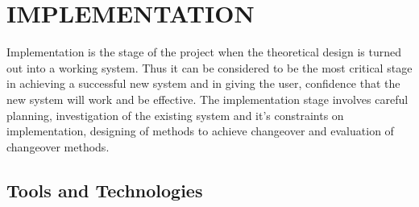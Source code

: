 \documentclass[./main.tex]{subfiles}
\begin{document}
\chapter{IMPLEMENTATION}
\noindent
Implementation is the stage of the project when the theoretical design is turned out into a working system. Thus it can be considered to be the most critical stage in achieving a successful new system and in giving the user, confidence that the new system will work and be effective. The implementation stage involves careful planning, investigation of the existing system and it’s constraints on implementation, designing of methods to achieve changeover and evaluation of changeover methods.
\section{Tools and Technologies}
\end{document}
